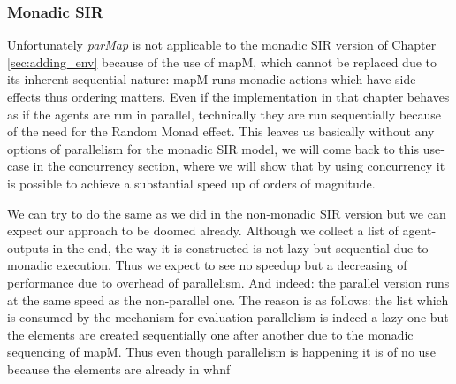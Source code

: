
\subsubsection{Monadic SIR}
Unfortunately \textit{parMap} is not applicable to the monadic SIR version of Chapter \ref{sec:adding_env} because of the use of mapM, which cannot be replaced due to its inherent sequential nature: mapM runs monadic actions which have side-effects thus ordering matters. Even if the implementation in that chapter behaves as if the agents are run in parallel, technically they are run sequentially because of the need for the Random Monad effect. This leaves us basically without any options of parallelism for the monadic SIR model, we will come back to this use-case in the concurrency section, where we will show that by using concurrency it is possible to achieve a substantial speed up of orders of magnitude.

We can try to do the same as we did in the non-monadic SIR version but we can expect our approach to be doomed already. Although we collect a list of agent-outputs in the end, the way it is constructed is not lazy but sequential due to monadic execution. Thus we expect to see no speedup but a decreasing of performance due to overhead of parallelism. And indeed: the parallel version runs at the same speed as the non-parallel one. The reason is as follows: the list which is consumed by the mechanism for evaluation parallelism is indeed a lazy one but the elements are created sequentially one after another due to the monadic sequencing of mapM. 
Thus even though parallelism is happening it is of no use because the elements are already in whnf

